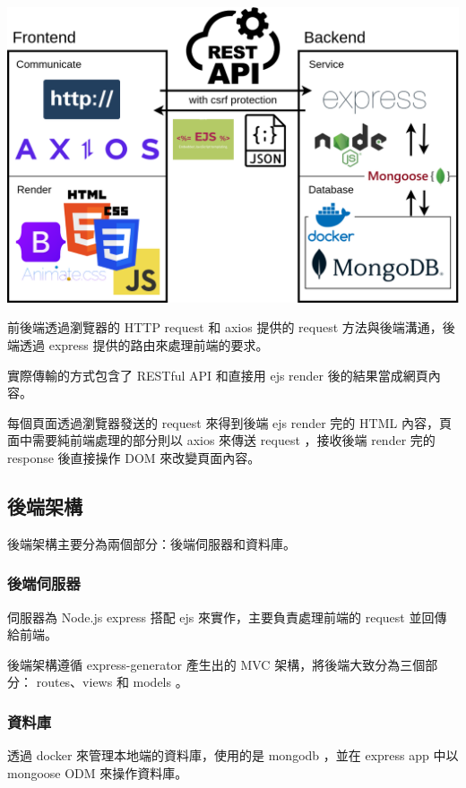 \documentclass{article}
\begin{document}
\centerline{\includegraphics[width=\textwidth]{HighLevelArchitecture.png}}

\bigskip

前後端透過瀏覽器的 HTTP request 和 axios 提供的 request 方法與後端溝通，後端透過 express 提供的路由來處理前端的要求。

實際傳輸的方式包含了 RESTful API 和直接用 ejs render 後的結果當成網頁內容。

每個頁面透過瀏覽器發送的 request 來得到後端 ejs render 完的 HTML 內容，頁面中需要純前端處理的部分則以 axios 來傳送 request ，接收後端 render 完的 response 後直接操作 DOM 來改變頁面內容。

\subsection{後端架構}

後端架構主要分為兩個部分：後端伺服器和資料庫。

\subsubsection{後端伺服器}

伺服器為 Node.js express 搭配 ejs 來實作，主要負責處理前端的 request 並回傳給前端。

後端架構遵循 express-generator 產生出的 MVC 架構，將後端大致分為三個部分： routes、views 和 models 。

\subsubsection{資料庫}

透過 docker 來管理本地端的資料庫，使用的是 mongodb ，並在 express app 中以 mongoose ODM 來操作資料庫。
\end{document}
